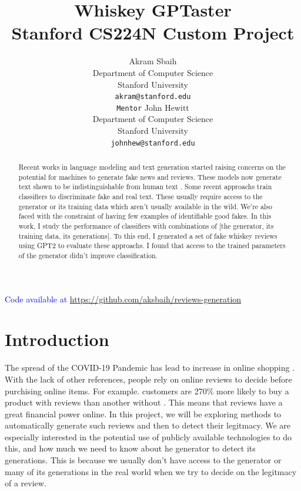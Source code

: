 \documentclass{article}
\title{
  Whiskey GPTaster \\
  \vspace{1em}
  \small{\normalfont Stanford CS224N Custom Project}  %
}
\author{
  Akram Sbaih \\
  Department of Computer Science \\
  Stanford University \\
  \texttt{akram@stanford.edu} \\
   \And
   \texttt{Mentor} John Hewitt \\
   Department of Computer Science \\
   Stanford University \\
   \texttt{johnhew@stanford.edu} \\
}
\newcommand{\note}[1]{\textcolor{blue}{{#1}}}
\begin{document}
\maketitle

\begin{abstract}
Recent works in language modeling and text generation started raising concerns on the potential for machines to generate fake news and reviews. These models now generate text shown to be indistinguishable from human text \cite{adelani2019generating}. Some recent approachs \cite{zellers2020defending} train classifiers to discriminate fake and real text. These usually require access to the generator or its training data which aren't usually available in the wild. We're also faced with the constraint of having few examples of identifiable good fakes. In this work, I study the performance of classifiers with combinations of [the generator, its training data, its generations]. To this end, I generated a set of fake whiskey reviews using GPT2 to evaluate these approachs. I found that access to the trained parameters of the generator didn't improve classification.
\end{abstract}

\note{Code available at \href{https://github.com/aksbaih/reviews-generation}{https://github.com/aksbaih/reviews-generation}}

\section{Introduction}
The spread of the COVID-19 Pandemic has lead to increase in online shopping \cite{covidincrease}. With the lack of other references, people rely on online reviews to decide before purchising online items. For example. customers are 270\% more likely to buy a product with reviews than another without \cite{reviews270}. This means that reviews have a great financial power online. In this project, we will be exploring methods to automatically generate such reviews and then to detect their legitmacy. We are especially interested in the potential use of publicly available technologies to do this, and how much we need to know about he generator to detect its generations. This is because we usually don't have access to the generator or many of its generations in the real world when we try to decide on the legitmacy of a review.
\end{document}
